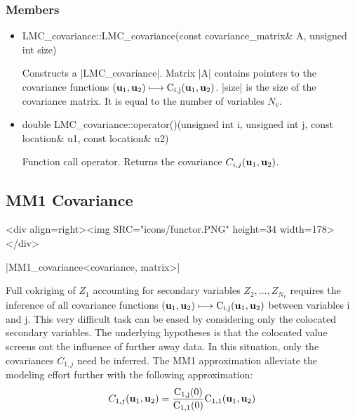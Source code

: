 \documentclass[12pt,twoside]{report}
\newcommand{\mloc}[1]{\rm{\bf #1}}
\begin{document}
 
\htmlrule[CLEAR=all]  \subsubsection*{Members}
\begin{itemize}

\item
 \begin{code} 
LMC_covariance::LMC_covariance(const covariance_matrix& A,
                               unsigned int size)
\end{code}

Constructs a |LMC_covariance|. Matrix |A| contains pointers to the covariance functions $(\mloc{u}_1,\mloc{u}_2) \longmapsto C_{i,j}(\mloc{u}_1,\mloc{u}_2)$. |size| is the size of the covariance matrix. It is equal to the number of variables $N_v$.

\item
 \begin{code} 
double LMC_covariance::operator()(unsigned int i, unsigned int j,
                                  const location& u1, const location& u2)
  \end{code}

Function call operator. Returns the covariance $C_{i,j}(\mloc{u}_1,\mloc{u}_2)$.
\end{itemize}







\subsection{MM1 Covariance}
\begin{htmlonly}
<div align=right><img SRC="icons/functor.PNG" height=34 width=178></div>
\end{htmlonly}

|MM1_covariance<covariance, matrix>|
\vspace{0.3cm}

Full cokriging of $Z_1$ accounting for secondary variables $Z_2,\ldots,Z_{N_v}$ requires the inference of all covariance functions $(\mloc{u}_1,\mloc{u}_2) \longmapsto C_{i,j}(\mloc{u}_1,\mloc{u}_2)$ between variables i and j.
This very difficult task can be eased by considering only the colocated secondary variables. The underlying hypotheses is that the colocated value screens out the influence of further away data. In this situation, only the covariances $C_{1,j}$ need be inferred. 
The MM1 approximation alleviate the modeling effort further with the following approximation:
\begin{displaymath}
  C_{1,j}(\mloc{u}_1,\mloc{u}_2) = \frac{C_{1,j}(0)}{C_{1,1}(0)}C_{1,1}(\mloc{u}_1,\mloc{u}_2)
\end{displaymath}
\end{document}
